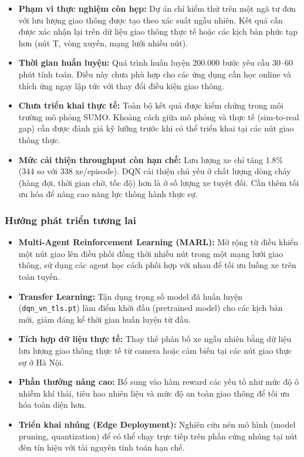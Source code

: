 \begin{itemize}
    \item \textbf{Phạm vi thực nghiệm còn hẹp:} Dự án chỉ kiểm thử trên một ngã tư đơn với lưu lượng giao thông được tạo theo xác suất ngẫu nhiên. Kết quả cần được xác nhận lại trên dữ liệu giao thông thực tế hoặc các kịch bản phức tạp hơn (nút T, vòng xuyến, mạng lưới nhiều nút).

    \item \textbf{Thời gian huấn luyện:} Quá trình huấn luyện 200.000 bước yêu cầu 30--60 phút tính toán. Điều này chưa phù hợp cho các ứng dụng cần học online và thích ứng ngay lập tức với thay đổi điều kiện giao thông.

    \item \textbf{Chưa triển khai thực tế:} Toàn bộ kết quả được kiểm chứng trong môi trường mô phỏng SUMO. Khoảng cách giữa mô phỏng và thực tế (sim-to-real gap) cần được đánh giá kỹ lưỡng trước khi có thể triển khai tại các nút giao thông thực.

    \item \textbf{Mức cải thiện throughput còn hạn chế:} Lưu lượng xe chỉ tăng 1.8\% (344 so với 338 xe/episode). DQN cải thiện chủ yếu ở chất lượng dòng chảy (hàng đợi, thời gian chờ, tốc độ) hơn là ở số lượng xe tuyệt đối. Cần thêm tối ưu hóa để nâng cao năng lực thông hành thực sự.
\end{itemize}

\subsubsection{Hướng phát triển tương lai}

\begin{itemize}
    \item \textbf{Multi-Agent Reinforcement Learning (MARL):} Mở rộng từ điều khiển một nút giao lên điều phối đồng thời nhiều nút trong một mạng lưới giao thông, sử dụng các agent học cách phối hợp với nhau để tối ưu luồng xe trên toàn tuyến.

    \item \textbf{Transfer Learning:} Tận dụng trọng số model đã huấn luyện (\texttt{dqn\_vn\_tls.pt}) làm điểm khởi đầu (pretrained model) cho các kịch bản mới, giảm đáng kể thời gian huấn luyện từ đầu.

    \item \textbf{Tích hợp dữ liệu thực tế:} Thay thế phân bố xe ngẫu nhiên bằng dữ liệu lưu lượng giao thông thực tế từ camera hoặc cảm biến tại các nút giao thực sự ở Hà Nội.

    \item \textbf{Phần thưởng nâng cao:} Bổ sung vào hàm reward các yếu tố như mức độ ô nhiễm khí thải, tiêu hao nhiên liệu và mức độ an toàn giao thông để tối ưu hóa toàn diện hơn.

    \item \textbf{Triển khai nhúng (Edge Deployment):} Nghiên cứu nén mô hình (model pruning, quantization) để có thể chạy trực tiếp trên phần cứng nhúng tại nút đèn tín hiệu với tài nguyên tính toán hạn chế.
\end{itemize}

